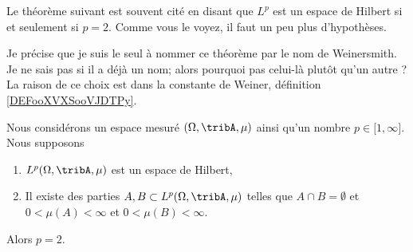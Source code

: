 Le théorème suivant est souvent cité en disant que \( L^p\) est un espace de Hilbert si et seulement si \( p=2\). Comme vous le voyez, il faut un peu plus d'hypothèses.

Je précise que je suis le seul à nommer ce théorème par le nom de Weinersmith. Je ne sais pas si il a déjà un nom; alors pourquoi pas celui-là plutôt qu'un autre ? La raison de ce choix est dans la constante de Weiner, définition \ref{DEFooXVXSooVJDTPy}.
\begin{theorem}      \label{THOooCCMBooGulxkQ}
    Nous considérons un espace mesuré \( (\Omega,\tribA, \mu)\) ainsi qu'un nombre \( p\in \mathopen[ 1 , \infty \mathclose]\). Nous supposons
    \begin{enumerate}
        \item
            \( L^p(\Omega,\tribA,\mu)\) est un espace de Hilbert,
        \item
            Il existe des parties \( A,B\subset L^p(\Omega,\tribA,\mu)\) telles que \( A\cap B=\emptyset\) et \( 0<\mu(A)<\infty\) et \( 0<\mu(B)<\infty\).
    \end{enumerate}
    Alors \( p=2\).
\end{theorem}

